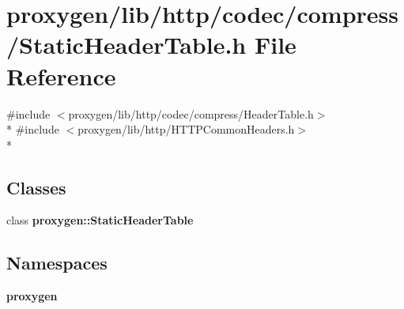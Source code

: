\section{proxygen/lib/http/codec/compress/\+Static\+Header\+Table.h File Reference}
\label{StaticHeaderTable_8h}
{\ttfamily \#include $<$proxygen/lib/http/codec/compress/\+Header\+Table.\+h$>$}\\*
{\ttfamily \#include $<$proxygen/lib/http/\+H\+T\+T\+P\+Common\+Headers.\+h$>$}\\*
\subsection*{Classes}
\begin{DoxyCompactItemize}
\item 
class {\bf proxygen\+::\+Static\+Header\+Table}
\end{DoxyCompactItemize}
\subsection*{Namespaces}
\begin{DoxyCompactItemize}
\item 
 {\bf proxygen}
\end{DoxyCompactItemize}
